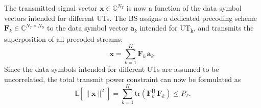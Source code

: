 The transmitted signal vector $\mathbf{x} \in \mathbb{C}^{N_T}$ is now a function of the data symbol vectors intended for different \acp{UT}. The \ac{BS} assigns a dedicated precoding scheme $\mathbf{F}_k \in \mathbb{C}^{N_T \times N_S}$ to the data symbol vector $\mathbf{a}_k$ intended for \ac{UT}\textsubscript{k}, and transmits the superposition of all precoded streams:
\begin{equation}
\label{eq:mu_mimo_precoding}
    \mathbf{x} = \sum_{k=1}^{K} \mathbf{F}_k \, \mathbf{a}_k.
\end{equation}
Since the data symbols intended for different \acp{UT} are assumed to be uncorrelated, the total transmit power constraint can now be formulated as
\begin{equation}
\label{eq:mu_mimo_power_constraint}
    \mathbb{E}\!\left[\|\mathbf{x}\|^2\right] = \sum_{k=1}^{K} \mathrm{tr}\!\left(\mathbf{F}_k^{\mathsf{H}} \, \mathbf{F}_k\right) \leq P_T.
\end{equation}
